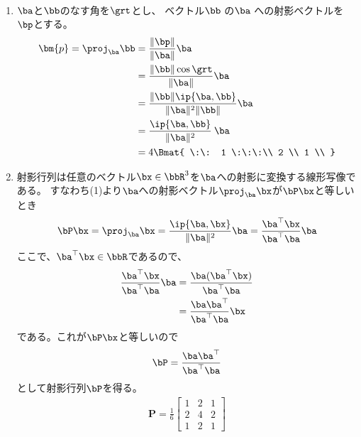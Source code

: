 \begin{ans*}
  ${}$
  \begin{enumerate}[label=(\arabic*)]
    \item $\ba$と$\bb$のなす角を$\grt$とし、
    ベクトル$\bb$ の$\ba$ への射影ベクトルを$\bp$とする。
    \begin{align}
      \bm{p}=\proj_{\ba} \bb
      &= \frac{\|\bp\|}{\|\ba\|}\ba \\
      &= \frac{\|\bb\|\cos\grt}{\|\ba\|}\ba \\
      &= \frac{\|\bb\|\ip{\ba,\bb}}{\|\ba\|^2\|\bb\|}\ba \\
      &= \frac{\ip{\ba,\bb}}{\|\ba\|^2}\:\ba \\
      &=
      4
      \Bmat{
      \:\:  1 \:\:\:\\ 2 \\ 1 \\
      }
    \end{align}
    \item
    射影行列は任意のベクトル$\bx\in\bbR^3$を$\ba$への射影に変換する線形写像である。
    すなわち(1)より$\ba$への射影ベクトル$\proj_{\ba}\bx$が$\bP\bx$と等しいとき
    \begin{gather}
      \bP\bx = \proj_{\ba}\bx = \frac{\ip{\ba,\bx}}{\|\ba\|^2} \ba = \frac{\ba^\top \bx}{\ba^{\top}\ba}\ba
    \end{gather}
    ここで、$\ba^{\top}\bx \in \bbR$であるので、
    \begin{align}
      \frac{\ba^\top \bx}{\ba^{\top}\ba}\ba
      &= \frac{\ba (\ba^{\top} \bx)}{\ba^{\top}\ba} \\
      &= \frac{\ba\ba^{\top}}{\ba^{\top}\ba}\bx
    \end{align}
    である。これが$\bP\bx$と等しいので
    \begin{gather}
      \bP = \frac{\ba\ba^{\top}}{\ba^{\top}\ba}
    \end{gather}
    として射影行列$\bP$を得る。
    \begin{align}
      \bm{P}
      = \frac{1}{6}
      \begin{bmatrix}
        1 & 2 & 1 \\ 2 & 4 & 2 \\ 1 & 2 & 1
      \end{bmatrix}
    \end{align}
  \end{enumerate}
\end{ans*}

